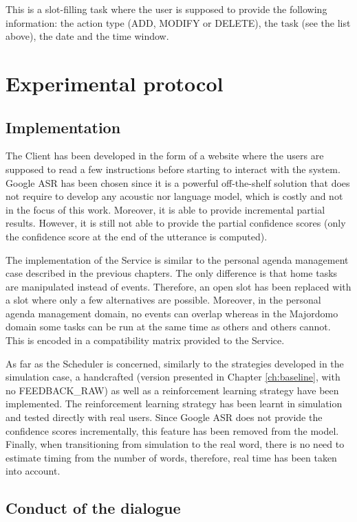 	This is a slot-filling task where the user is supposed to provide the following information: the action type (ADD, MODIFY or DELETE), the task (see the list above), the date and the time window.

\section{Experimental protocol}

	\subsection{Implementation}
	
		The Client has been developed in the form of a website where the users are supposed to read a few instructions before starting to interact with the system. Google ASR has been chosen since it is a powerful off-the-shelf solution that does not require to develop any acoustic nor language model, which is costly and not in the focus of this work. Moreover, it is able to provide incremental partial results. However, it is still not able to provide the partial confidence scores (only the confidence score at the end of the utterance is computed).
		
		The implementation of the Service is similar to the personal agenda management case described in the previous chapters. The only difference is that home tasks are manipulated instead of events. Therefore, an open slot has been replaced with a slot where only a few alternatives are possible. Moreover, in the personal agenda management domain, no events can overlap whereas in the Majordomo domain some tasks can be run at the same time as others and others cannot. This is encoded in a compatibility matrix provided to the Service.
		
		As far as the Scheduler is concerned, similarly to the strategies developed in the simulation case, a handcrafted (version presented in Chapter \ref{ch:baseline}, with no FEEDBACK\_RAW) as well as a reinforcement learning strategy have been implemented. The reinforcement learning strategy has been learnt in simulation and tested directly with real users. Since Google ASR does not provide the confidence scores incrementally, this feature has been removed from the model. Finally, when transitioning from simulation to the real word, there is no need to estimate timing from the number of words, therefore, real time has been taken into account.
		
	\subsection{Conduct of the dialogue}
	
